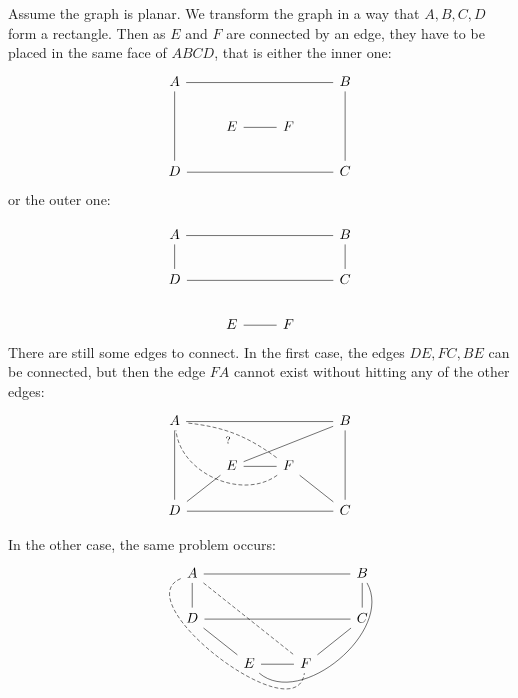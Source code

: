 \documentclass{article}
\begin{document}
\begin{solving}
    Assume the graph is planar. We transform the graph in a way that $A,B,C,D$ form a rectangle. Then as $E$ and $F$ are connected by an edge, they have to be placed in the same face of $ABCD$, that is either the inner one: 
    \[
    \begin{tikzcd}
        A &&& B\\
        &E&F\\
        D&&&C
    \arrow[no head, from=1-1, to=1-4]
    \arrow[no head, from=1-1, to=3-1]
    \arrow[no head, from=1-4, to=3-4]
    \arrow[no head, from=3-1, to=3-4]
    \arrow[no head, from=2-2, to=2-3]
    \end{tikzcd}
    \]
 or the outer one:
 
    \[
    \begin{tikzcd}
        A &&& B\\
        D&&&C\\
        &E&F
    \arrow[no head, from=1-1, to=1-4]
    \arrow[no head, from=1-1, to=2-1]
    \arrow[no head, from=1-4, to=2-4]
    \arrow[no head, from=2-1, to=2-4]
    \arrow[no head, from=3-2, to=3-3]
    \end{tikzcd}
    \]
There are still some edges to connect. In the first case, the edges $DE, FC, BE$ can be connected, but then the edge $FA$ cannot exist without hitting any of the other edges:
        \[
    \begin{tikzcd}
        A &&& B\\
        &E&F\\
        D&&&C
    \arrow[no head, from=1-1, to=1-4]
    \arrow[no head, from=1-1, to=3-1]
    \arrow[no head, from=1-4, to=3-4]
    \arrow[no head, from=3-1, to=3-4]
    \arrow[no head, from=2-2, to=2-3]
    \arrow[no head, from=3-1, to=2-2]
    \arrow[no head, from=2-3, to=3-4]
    \arrow[no head, from=2-2, to=1-4]
    \arrow[no head, from=2-3, to=1-1, dashed, bend left=60]
    \arrow[no head, from=2-3, to=1-1, dashed, bend right= 15, "?"]
    \end{tikzcd}
    \]

In the other case, the same problem occurs:
\[
    \begin{tikzcd}
        A&&&B\\
        D&&&C\\
        &E&F
    \arrow[no head, from=1-1, to=1-4]
    \arrow[no head, from=1-1, to=2-1]
    \arrow[no head, from=1-4, to=2-4]
    \arrow[no head, from=2-1, to=2-4]
    \arrow[no head, from=3-2, to=3-3]
    \arrow[no head, from=2-1, to=3-2]
    \arrow[no head, from=2-4, to=3-3]
    \arrow[no head, from=1-4, to=3-2, bend left= 80]
    \arrow[no head, from=1-1, to=3-3, dashed]
    \arrow[no head, from=1-1, to=3-3, dashed, bend right = 120]
    \end{tikzcd}
    \]
\end{solving}
\newpage
\end{document}
